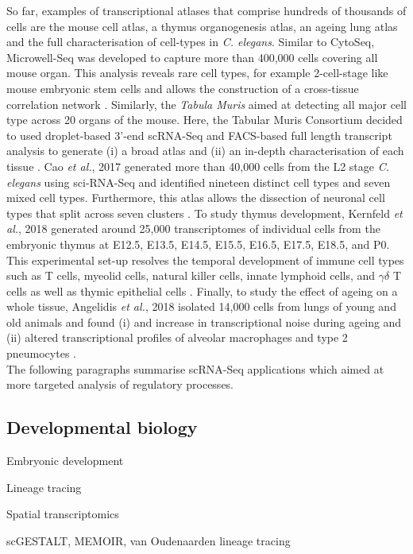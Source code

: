 So far, examples of transcriptional atlases that comprise hundreds of thousands of cells are the mouse cell atlas, a thymus organogenesis atlas, an ageing lung atlas and the full characterisation of cell-types in \textit{C. elegans}. Similar to CytoSeq, Microwell-Seq was developed to capture more than 400,000 cells covering all mouse organ. This analysis reveals rare cell types, for example 2-cell-stage like mouse embryonic stem cells and allows the construction of a cross-tissue correlation network \cite{Han2018}. Similarly, the \emph{Tabula Muris} aimed at detecting all major cell type across 20 organs of the mouse. Here, the Tabular Muris Consortium decided to used droplet-based 3'-end scRNA-Seq and FACS-based full length transcript analysis to generate (i) a broad atlas and (ii) an in-depth characterisation of each tissue \citep{Quake2018}. Cao \emph{et al.}, 2017 generated more than 40,000 cells from the L2 stage \emph{C. elegans} using sci-RNA-Seq and identified nineteen distinct cell types and seven mixed cell types. Furthermore, this atlas allows the dissection of neuronal cell types that split across seven clusters \citep{Cao2017}. To study thymus development, Kernfeld \emph{et al.}, 2018 generated around 25,000 transcriptomes of individual cells from the embryonic thymus at E12.5, E13.5, E14.5, E15.5, E16.5, E17.5, E18.5, and P0. This experimental set-up resolves the temporal development of immune cell types such as T cells, myeolid cells, natural killer cells, innate lymphoid cells, and $\gamma{}\delta{}$ T cells as well as thymic epithelial cells \citep{Kernfeld2018}. Finally, to study the effect of ageing on a whole tissue, Angelidis \emph{et al.}, 2018 isolated 14,000 cells from lungs of young and old animals and found (i) and increase in transcriptional noise during ageing and (ii) altered transcriptional profiles of alveolar macrophages and type 2 pneumocytes \citep{Angelidis2018}.\\

The following paragraphs summarise scRNA-Seq applications which aimed at more targeted analysis of regulatory processes.

\subsection{Developmental biology}

Embryonic development

Lineage tracing

Spatial transcriptomics

scGESTALT, MEMOIR, van Oudenaarden lineage tracing

